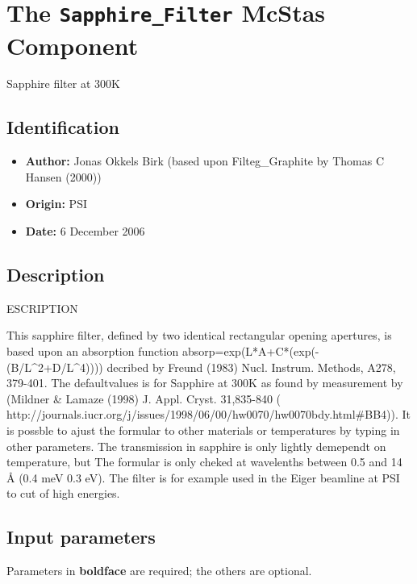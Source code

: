 \section{The \texttt{Sapphire\_Filter} McStas Component}
Sapphire filter at 300K

\subsection*{Identification}
\begin{itemize}
  \item \textbf{Author:} Jonas Okkels Birk (based upon Filteg\_Graphite by Thomas C Hansen (2000))
  \item \textbf{Origin:} PSI
  \item \textbf{Date:} 6 December 2006
\end{itemize}

\subsection*{Description}
ESCRIPTION

This sapphire filter, defined by two identical rectangular opening apertures, is based upon an absorption function absorp=exp(L*A+C*(exp(-(B/L\textasciicircum{}2+D/L\textasciicircum{}4)))) decribed by Freund (1983) Nucl. Instrum. Methods, A278, 379-401. The defaultvalues is for Sapphire at 300K as found by measurement by (Mildner \& Lamaze (1998) J. Appl. Cryst. 31,835-840 ( http://journals.iucr.org/j/issues/1998/06/00/hw0070/hw0070bdy.html\#BB4)). It is possble to ajust the formular to other materials or temperatures by typing in other parameters. The transmission in sapphire is only lightly demependt on temperature, but The formular is only cheked at wavelenths between 0.5 and 14 \AA{} (0.4 meV 0.3 eV). The filter is for example used in the Eiger beamline at PSI to cut of high energies.

\subsection*{Input parameters}
Parameters in \textbf{boldface} are required; the others are optional.

